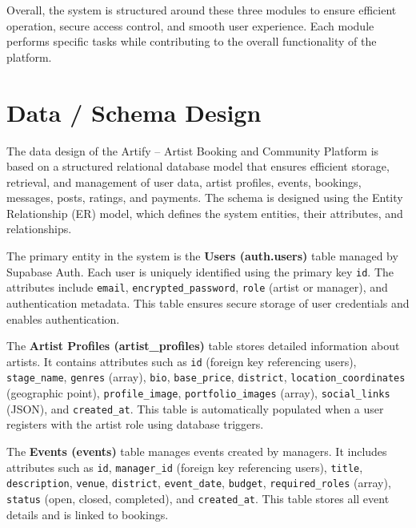 \documentclass[12pt,a4paper]{report}
\begin{document}
Overall, the system is structured around these three modules to ensure efficient operation, secure access control, and smooth user experience. Each module performs specific tasks while contributing to the overall functionality of the platform.

\section{Data / Schema Design}

The data design of the Artify -- Artist Booking and Community Platform is based on a structured relational database model that ensures efficient storage, retrieval, and management of user data, artist profiles, events, bookings, messages, posts, ratings, and payments. The schema is designed using the Entity Relationship (ER) model, which defines the system entities, their attributes, and relationships.

The primary entity in the system is the \textbf{Users (auth.users)} table managed by Supabase Auth. Each user is uniquely identified using the primary key \texttt{id}. The attributes include \texttt{email}, \texttt{encrypted\_password}, \texttt{role} (artist or manager), and authentication metadata. This table ensures secure storage of user credentials and enables authentication.

\vspace{0.3cm}

The \textbf{Artist Profiles (artist\_profiles)} table stores detailed information about artists. It contains attributes such as \texttt{id} (foreign key referencing users), \texttt{stage\_name}, \texttt{genres} (array), \texttt{bio}, \texttt{base\_price}, \texttt{district}, \texttt{location\_coordinates} (geographic point), \texttt{profile\_image}, \texttt{portfolio\_images} (array), \texttt{social\_links} (JSON), and \texttt{created\_at}. This table is automatically populated when a user registers with the artist role using database triggers.

\vspace{0.3cm}

The \textbf{Events (events)} table manages events created by managers. It includes attributes such as \texttt{id}, \texttt{manager\_id} (foreign key referencing users), \texttt{title}, \texttt{description}, \texttt{venue}, \texttt{district}, \texttt{event\_date}, \texttt{budget}, \texttt{required\_roles} (array), \texttt{status} (open, closed, completed), and \texttt{created\_at}. This table stores all event details and is linked to bookings.
\end{document}
